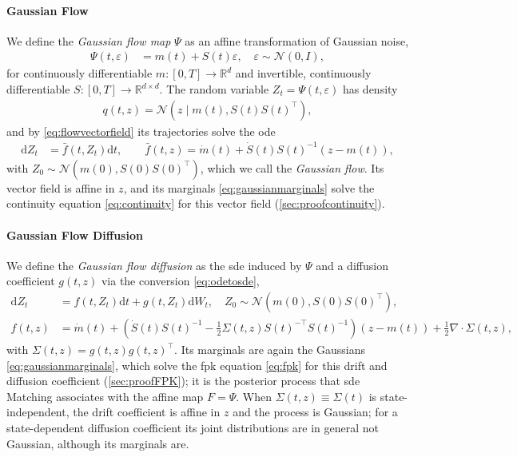 \documentclass{article} %
\newcommand{\postdrift}{f}
\newcommand{\odedrift}{\bar f}
\newcommand{\vol}{g}
\newcommand{\flow}{\Psi}
\newcommand{\diff}{{\mathrm{d}}}
\newcommand{\Norm}{\mathcal{N}}
\newcommand{\reals}{\mathbb{R}}
\begin{document}
\paragraph{Gaussian Flow}
We define the \emph{Gaussian flow map} $\flow$ as an affine transformation of Gaussian noise,
\begin{align}
    \flow(t, \varepsilon) &= m(t)+S(t)\varepsilon, \quad \varepsilon \sim \Norm(0,I),
    \label{eq:flowmap}
\end{align}
for continuously differentiable $m : [0,T] \to \reals^d$ and invertible, continuously differentiable ${S : [0,T] \to \reals^{d\times d}}$. The random variable $Z_t = \flow(t, \varepsilon)$ has density
\begin{align}
    q(t, z) = \Norm(z \mid m(t), S(t)S(t)^\top),
    \label{eq:gaussianmarginals}
\end{align}
and by \cref{eq:flowvectorfield} its trajectories solve the \gls{ode}
\begin{align}
    \diff Z_t &= \odedrift(t,Z_t) \diff t, \qquad
    \odedrift(t,z) = \dot m(t)+\dot S(t) S(t)^{-1}(z-m(t)),
    \label{eq:gaussianflow}
\end{align}
with $Z_0 \sim \Norm(m(0),S(0)S(0)^\top)$, which we call the \emph{Gaussian flow}. Its vector field is affine in $z$, and its marginals \cref{eq:gaussianmarginals} solve the continuity equation \cref{eq:continuity} for this vector field (\cref{sec:proofcontinuity}).

\paragraph{Gaussian Flow Diffusion}
We define the \emph{Gaussian flow diffusion} as the \gls{sde} induced by $\flow$ and a diffusion coefficient $\vol(t,z)$ via the conversion \cref{eq:odetosde},
\begin{align}
    \diff Z_t &= \postdrift(t,Z_t) \diff t+ \vol(t,Z_t)\diff W_t, \quad Z_0 \sim \Norm(m(0),S(0)S(0)^\top),
    \label{eq:gaussianflowdiffusion} \\
    \postdrift(t,z) &= \dot m(t)+\left(\dot S(t)S(t)^{-1} -\frac{1}{2}\Sigma(t,z) S(t)^{-\top}S(t)^{-1}\right)(z-m(t))+\frac{1}{2}\nabla \cdot \Sigma(t, z), \nonumber
\end{align}
with $\Sigma(t, z) = \vol(t,z)\vol(t,z)^\top$. Its marginals are again the Gaussians \cref{eq:gaussianmarginals}, which solve the \gls{fpk} equation \cref{eq:fpk} for this drift and diffusion coefficient (\cref{sec:proofFPK}); it is the posterior process that \gls{sde} Matching associates with the affine map $F = \flow$. When $\Sigma(t, z) \equiv \Sigma(t)$ is state-independent, the drift coefficient is affine in $z$ and the process is Gaussian; for a state-dependent diffusion coefficient its joint distributions are in general not Gaussian, although its marginals are.
\end{document}
